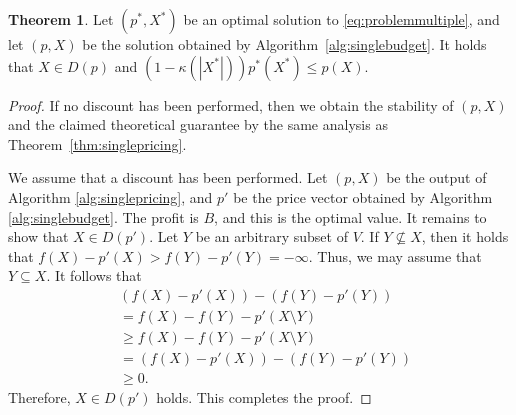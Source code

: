 \documentclass[letterpaper]{article}
\theoremstyle{definition}
\newtheorem{theorem}{Theorem}
\begin{document}
\begin{algorithm}[tb]
\caption{Pricing algorithm for a single buyer with a budget constraint.}
\label{alg:singlebudget}
\begin{algorithmic}
\end{algorithmic}
\end{algorithm}

\begin{theorem}
\label{thm:singlebudget}
Let $(p^*, X^*)$ be an optimal solution to \eqref{eq:problemmultiple},
and let $(p, X)$ be the solution obtained by Algorithm~\ref{alg:singlebudget}.
It holds that $X\in D(p)$ and \((1-\kappa(|X^*|))p^*(X^*)\le p(X)\).
\end{theorem}
\begin{proof}%
If no discount has been performed, then we obtain the stability of $(p, X)$ and the claimed theoretical guarantee by the same analysis as Theorem~\ref{thm:singlepricing}. 

We assume that a discount has been performed. 
Let $(p, X)$ be the output of Algorithm \ref{alg:singlepricing}, and $p'$ be the price vector obtained by Algorithm \ref{alg:singlebudget}. 
The profit is $B$, and this is the optimal value. 
It remains to show that $X \in D(p')$. 
Let $Y$ be an arbitrary subset of $V$. 
If $Y \not\subseteq X$, then it holds that $f(X) - p'(X) > f(Y)-p'(Y) = - \infty$. 
Thus, we may assume that $Y \subseteq X$. 
It follows that
\begin{align*}
&(f(X) - p'(X)) - (f(Y) - p'(Y)) \\
&= f(X)-f(Y)-p'(X \setminus Y) \\
&\geq f(X)-f(Y)-p'(X \setminus Y)\\
&= (f(X) - p'(X)) - (f(Y) - p'(Y))\\
&\geq 0.
\end{align*}
Therefore, $X \in D(p')$ holds. 
This completes the proof.
\end{proof}
\end{document}

